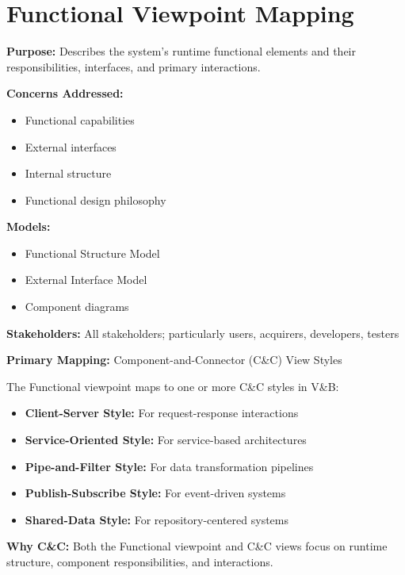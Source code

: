 \documentclass[11pt]{article}
\begin{document}
\section{Functional Viewpoint Mapping}

\begin{rwbox}
\textbf{Purpose:} Describes the system's runtime functional elements and their responsibilities, interfaces, and primary interactions.

\textbf{Concerns Addressed:}
\begin{itemize}[nosep]
    \item Functional capabilities
    \item External interfaces
    \item Internal structure
    \item Functional design philosophy
\end{itemize}

\textbf{Models:}
\begin{itemize}[nosep]
    \item Functional Structure Model
    \item External Interface Model
    \item Component diagrams
\end{itemize}

\textbf{Stakeholders:} All stakeholders; particularly users, acquirers, developers, testers
\end{rwbox}

\begin{vbbox}
\textbf{Primary Mapping:} Component-and-Connector (C\&C) View Styles

The Functional viewpoint maps to one or more C\&C styles in V\&B:

\begin{itemize}
    \item \textbf{Client-Server Style:} For request-response interactions
    \item \textbf{Service-Oriented Style:} For service-based architectures
    \item \textbf{Pipe-and-Filter Style:} For data transformation pipelines
    \item \textbf{Publish-Subscribe Style:} For event-driven systems
    \item \textbf{Shared-Data Style:} For repository-centered systems
\end{itemize}

\textbf{Why C\&C:} Both the Functional viewpoint and C\&C views focus on runtime structure, component responsibilities, and interactions.
\end{vbbox}
\end{document}

